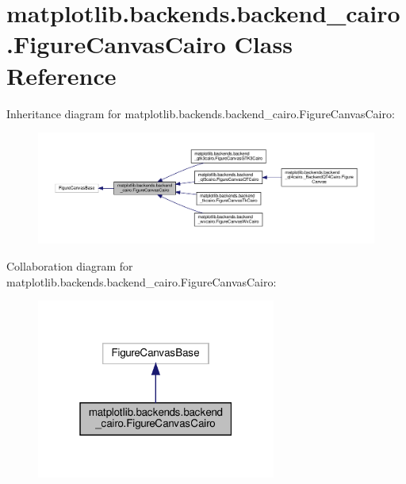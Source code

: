 \hypertarget{classmatplotlib_1_1backends_1_1backend__cairo_1_1FigureCanvasCairo}{}\section{matplotlib.\+backends.\+backend\+\_\+cairo.\+Figure\+Canvas\+Cairo Class Reference}
\label{classmatplotlib_1_1backends_1_1backend__cairo_1_1FigureCanvasCairo}


Inheritance diagram for matplotlib.\+backends.\+backend\+\_\+cairo.\+Figure\+Canvas\+Cairo\+:
\nopagebreak
\begin{figure}[H]
\begin{center}
\leavevmode
\includegraphics[width=350pt]{classmatplotlib_1_1backends_1_1backend__cairo_1_1FigureCanvasCairo__inherit__graph}
\end{center}
\end{figure}


Collaboration diagram for matplotlib.\+backends.\+backend\+\_\+cairo.\+Figure\+Canvas\+Cairo\+:
\nopagebreak
\begin{figure}[H]
\begin{center}
\leavevmode
\includegraphics[width=223pt]{classmatplotlib_1_1backends_1_1backend__cairo_1_1FigureCanvasCairo__coll__graph}
\end{center}
\end{figure}
